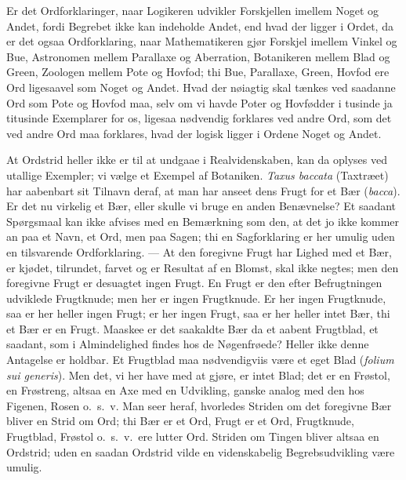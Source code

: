\documentclass[12pt]{book}
\newcommand{\opage}[1]{\marginnote{\footnotesize\textit{[#1]}}}
\begin{document}
Er det Ordforklaringer, naar Logikeren udvikler Forskjellen imellem Noget og Andet, fordi Begrebet ikke kan indeholde Andet, end hvad der ligger i Ordet, da er det ogsaa Ordforklaring, naar Mathematikeren gjør Forskjel imellem Vinkel og Bue, Astronomen mellem Parallaxe og Aberration, Botanikeren mellem Blad og Green, Zoologen mellem Pote og Hovfod; thi Bue, Parallaxe, Green, Hovfod ere Ord ligesaavel som Noget og Andet. Hvad der nøiagtig skal tænkes ved saadanne Ord som Pote og Hovfod maa, selv om vi havde Poter og Hovfødder i tusinde ja titusinde Exemplarer
\opage{3}for os, ligesaa nødvendig forklares ved andre Ord, som det ved andre Ord maa forklares, hvad der logisk ligger i Ordene Noget og Andet.

At Ordstrid heller ikke er til at undgaae i Realvidenskaben, kan da oplyses ved utallige Exempler; vi vælge et Exempel af Botaniken. \textit{Taxus baccata} (Taxtræet) har aabenbart sit Tilnavn deraf, at man har anseet dens Frugt for et Bær (\textit{bacca}). Er det nu virkelig et Bær, eller skulle vi bruge en anden Benævnelse? Et saadant Spørgsmaal kan ikke afvises med en Bemærkning som den, at det jo ikke kommer an paa et Navn, et Ord, men paa Sagen; thi en Sagforklaring er her umulig uden en tilsvarende Ordforklaring. --- At den foregivne Frugt har Lighed med et Bær, er kjødet, tilrundet, farvet og er Resultat af en Blomst, skal ikke negtes; men den foregivne Frugt er desuagtet ingen Frugt. En Frugt er den efter Befrugtningen udviklede Frugtknude; men her er ingen Frugtknude. Er her ingen Frugtknude, saa er her heller ingen Frugt; er her ingen Frugt, saa er her heller intet Bær, thi et Bær er en Frugt. Maaskee er det saakaldte Bær da et aabent Frugtblad, et saadant, som i Almindelighed findes hos de Nøgenfrøede? Heller ikke denne Antagelse er holdbar. Et Frugtblad maa nødvendigviis være et eget Blad (\textit{folium sui generis}). Men det, vi her have med at gjøre, er intet Blad; det er en Frøstol, en Frøstreng, altsaa en Axe med en Udvikling, ganske analog med den hos Figenen, Rosen o.\ s.\ v. Man seer heraf, hvorledes Striden om det foregivne Bær bliver en Strid om Ord; thi Bær er et Ord, Frugt er et Ord, Frugtknude, Frugtblad, Frøstol o.\ s.\ v.\ ere lutter Ord. Striden om Tingen bliver altsaa en Ordstrid; uden en saadan Ordstrid vilde en videnskabelig Begrebsudvikling være umulig.
\end{document}
